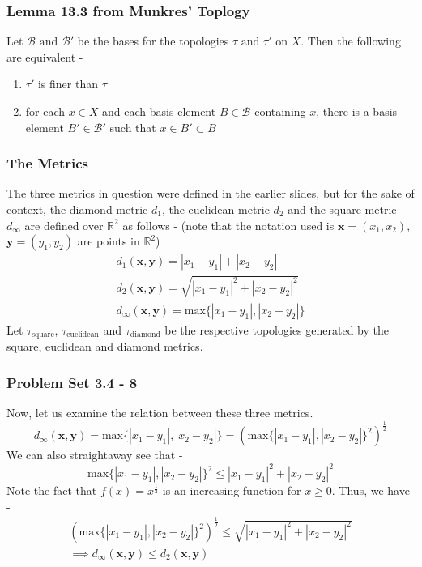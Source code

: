 \begin{frame}
    \frametitle{Lemma 13.3 from Munkres' Toplogy}
    Let $\mathcal{B} \text{ and } \mathcal{B}'$ be the bases for the topologies $\tau \text{ and } \tau'$ on $X$. Then the following are equivalent -
    \begin{enumerate}
        \item $\tau'$ is finer than $\tau$
        \item for each $x \in X$ and each basis element $B \in \mathcal{B}$ containing $x$, there is a basis element $B' \in \mathcal{B}'$ such that $x \in B' \subset B$
    \end{enumerate}
\end{frame}

\begin{frame}
    \frametitle{The Metrics}
    The three metrics in question were defined in the earlier slides, but for the sake of context, the diamond metric $d_1$, the euclidean metric $d_2$ and the square metric $d_\infty$ are defined over $\mathbb{R}^2$ as follows - (note that the notation used is $\boldsymbol{x} = (x_1, x_2)$, $\boldsymbol{y} = (y_1, y_2)$ are points in $\mathbb{R}^2$)
    \begin{gather*}
        d_1(\boldsymbol{x}, \boldsymbol{y}) = |x_1 - y_1| + |x_2 - y_2| \\
        d_2(\boldsymbol{x}, \boldsymbol{y}) = \sqrt{|x_1 - y_1|^2 + |x_2 - y_2|^2} \\
        d_\infty(\boldsymbol{x}, \boldsymbol{y}) = \text{max} \{|x_1 - y_1|, |x_2 - y_2|\}
    \end{gather*}
    Let $\tau_{\text{square}}$, $\tau_{\text{euclidean}}$ and $\tau_{\text{diamond}}$ be the respective topologies generated by the square, euclidean and diamond metrics.
\end{frame}

\begin{frame}
    \frametitle{Problem Set 3.4 - 8}
    Now, let us examine the relation between these three metrics.
    \begin{equation*}
        d_\infty(\boldsymbol{x}, \boldsymbol{y}) = \text{max} \{|x_1 - y_1|, |x_2 - y_2|\} = \left(\text{max} \{|x_1 - y_1|, |x_2 - y_2|\}^2 \right)^{\frac{1}{2}}
    \end{equation*}
    We can also straightaway see that -
    \begin{equation*}
        \text{max} \{|x_1 - y_1|, |x_2 - y_2|\}^2 \leq |x_1 - y_1|^2 + |x_2 - y_2|^2
    \end{equation*}
    Note the fact that $f(x) = x^{\frac{1}{2}}$ is an increasing function for $x \geq 0$. Thus, we have -
    \begin{gather*}
        \left(\text{max} \{|x_1 - y_1|, |x_2 - y_2|\}^2 \right)^{\frac{1}{2}} \leq \sqrt{|x_1 - y_1|^2 + |x_2 - y_2|^2} \\
        \implies d_\infty(\boldsymbol{x}, \boldsymbol{y}) \leq d_2(\boldsymbol{x}, \boldsymbol{y})
    \end{gather*} 
\end{frame}

